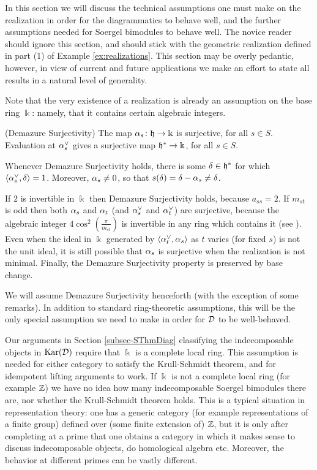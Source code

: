In this section we will discuss the technical assumptions one must make on the realization in order for the diagrammatics to behave well, and the further assumptions needed for Soergel
bimodules to behave well. The novice reader should ignore this section, and should stick with the geometric realization defined in part (1) of Example \ref{ex:realizations}. This section
may be overly pedantic, however, in view of current and future applications we make an effort to state all results in a natural level of generality.

Note that the very existence of a realization is already an assumption on the base ring $\Bbbk$: namely, that it contains certain algebraic integers.

\begin{assumption}(Demazure Surjectivity) \label{ass:Demazure Surjectivity} The map $\alpha_s \colon {\mathfrak h} \rightarrow \Bbbk$ is surjective, for all $s \in S$. Evaluation at $\alpha_s^\vee$ gives a surjective
map ${\mathfrak h}^* \rightarrow \Bbbk$, for all $s \in S$. \end{assumption}

Whenever Demazure Surjectivity holds, there is some $\delta \in {\mathfrak h}^*$ for which $\langle \alpha_s^\vee,\delta \rangle = 1$. Moreover, $\alpha_s \ne 0$, so that $s(\delta) = \delta - \alpha_s \ne \delta$.

If $2$ is invertible in $\Bbbk$ then Demazure Surjectivity holds, because $a_{ss}=2$. If $m_{st}$ is odd then both $\alpha_s$ and $\alpha_t$ (and $\alpha_s^\vee$ and $\alpha_t^\vee$) are surjective,
because the algebraic integer $4 \cos^2(\frac{\pi}{m_{st}})$ is invertible in any ring which contains it (see \cite{EDihedral}). Even when the ideal in $\Bbbk$ generated by $\langle
\alpha_t^\vee, \alpha_s \rangle$ as $t$ varies (for fixed $s$) is not the unit ideal, it is still possible that $\alpha_s$ is surjective when the realization is not minimal. Finally, the Demazure Surjectivity property is preserved by base change.

We will assume Demazure Surjectivity henceforth (with the exception of some remarks). In addition to standard ring-theoretic assumptions, this will be the only special assumption we need
to make in order for ${\mathcal{D}}$ to be well-behaved.

Our arguments in Section \ref{subsec-SThmDiag} classifying the indecomposable objects in $\textrm{Kar}({\mathcal{D}})$ require that $\Bbbk$ is a complete local ring. This assumption is needed for either
category to satisfy the Krull-Schmidt theorem, and for idempotent lifting arguments to work. If $\Bbbk$ is not a complete local ring (for example ${\mathbb{Z}}$) we have no idea how many
indecomposable Soergel bimodules there are, nor whether the Krull-Schmidt theorem holds. This is a typical situation in representation theory: one has a generic category (for example
representations of a finite group) defined over (some finite extension of) ${\mathbb{Z}}$, but it is only after completing at a prime that one obtains a category in which it makes sense to discuss
indecomposable objects, do homological algebra etc. Moreover, the behavior at different primes can be vastly different.

